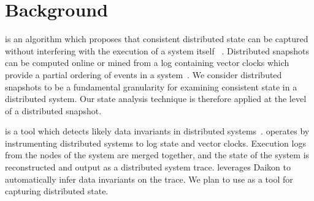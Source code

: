 \section{Background}
\label{sec:background}


 is an algorithm which
proposes that consistent distributed state can be captured without
interfering with the execution of a system itself
~\cite{dist_snapshots_Chandy1985}.  Distributed snapshots can be
computed online or mined from a log containing vector clocks which
provide a partial ordering of events in a
system~\cite{mattern_vector_clocks_1989}. We consider distributed
snapshots to be a fundamental granularity for examining consistent
state in a distributed system. Our state analysis technique is therefore applied at the level
of a distributed snapshot.

\noindent{\textbf{\dinv}} is a tool which detects likely data invariants in distributed
systems~\cite{dinv}. \dinv operates by instrumenting distributed
systems to log state and vector clocks. Execution logs from the nodes
of the system are merged together, and the state of the system is
reconstructed and output as a distributed system trace. \dinv
leverages Daikon to automatically infer data invariants on the trace.
We plan to use \dinv as a tool for capturing distributed state.

